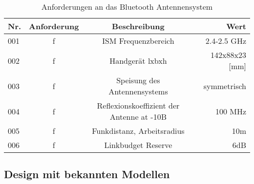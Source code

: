 
\begin{table}[htb]
\centering
\begin{tabular}{lccr} \toprule 
Nr. & Anforderung & Beschreibung & Wert   \\ 
\midrule
001 & f & ISM Frequenzbereich  & 2.4-2.5 GHz  \\ 
002 & f & Handgerät lxbxh & 142x88x23 [mm]    \\  
003 & f &  Speisung des Antennensystems & symmetrisch  \\  
004 & f & Reflexionskoeffizient der Antenne  at -10B & 100 MHz  \\ 
005 & f & Funkdistanz, Arbeitsradius & 10m   \\ 
006 & f & Linkbudget Reserve & 6dB   \\ 
\bottomrule
  \end{tabular}
  \caption{Anforderungen an das Bluetooth Antennensystem}
  \label{AnforderungenAntenneSystem}
\end{table} 

\subsection{Design mit bekannten Modellen}


